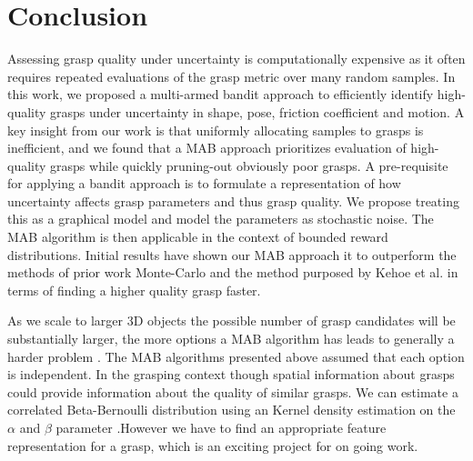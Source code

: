 \documentclass[journal,transmag]{IEEEtran}%
\begin{document}
\section{Conclusion}
Assessing grasp quality under  uncertainty is computationally expensive as it often requires repeated evaluations of the grasp metric over many random samples.
In this work, we proposed a multi-armed bandit approach to efficiently identify high-quality grasps under uncertainty in shape, pose, friction coefficient and motion. 
A key insight from our work is that uniformly allocating samples to grasps is inefficient, and
 we found that a MAB approach prioritizes evaluation of high-quality grasps while quickly pruning-out obviously poor grasps.
A pre-requisite for applying a bandit approach is to formulate a representation  of how uncertainty affects grasp parameters and thus grasp quality.
We propose treating this as a graphical model and model the parameters as stochastic noise. The MAB algorithm is then applicable in the context of bounded reward distributions. Initial results have shown our MAB approach it to outperform the methods of prior work Monte-Carlo and the method purposed by Kehoe et al. \cite{kehoe2012estimating} in terms of finding a higher quality grasp faster. 




As we scale to larger 3D objects the possible number of grasp candidates will be substantially larger, the more options a MAB algorithm has leads to generally a harder problem \cite{bubeck2009pure}. The MAB algorithms presented above assumed that each option is independent. In the grasping context though spatial information about grasps could provide information about the quality of similar grasps. We can estimate a correlated Beta-Bernoulli distribution using an Kernel density estimation on the $\alpha$ and $\beta$ parameter \cite{goetschalckx2011continuous}.However we have to find an appropriate feature representation for a grasp, which is an exciting project for on going work. 


\end{document}

